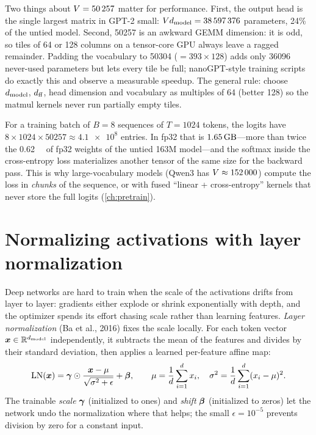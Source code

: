 \begin{systemslens}
Two things about $V=\num{50257}$ matter for performance. First, the output head is the single
largest matrix in GPT-2 small: $Vd_{\text{model}}=\num{38597376}$ parameters, 24\% of the untied model.
Second, \num{50257} is an awkward GEMM dimension: it is odd, so tiles of 64 or 128 columns on a
tensor-core GPU always leave a ragged remainder. Padding the vocabulary to \num{50304}
($=393\times128$) adds only \num{36096} never-used parameters but lets every tile be full;
nanoGPT-style training scripts do exactly this and observe a measurable speedup. The general rule:
choose $d_{\text{model}}$, $d_{\text{ff}}$, head dimension and vocabulary as multiples of 64 (better 128) so the
matmul kernels never run partially empty tiles.
\end{systemslens}

\begin{napkinmath}
For a training batch of $B=8$ sequences of $T=1024$ tokens, the logits have
$8\times1024\times\num{50257}\approx\num{4.1e8}$ entries. In fp32 that is
$\SI{1.65}{\giga\byte}$---more than twice the \SI{0.62}{\giga\byte} of fp32 weights of the
untied 163M model---and the softmax inside the cross-entropy loss materializes another tensor of
the same size for the backward pass. This is why large-vocabulary models (Qwen3 has
$V\approx\num{152000}$) compute the loss in \emph{chunks} of the sequence, or with fused
``linear + cross-entropy'' kernels that never store the full logits (\cref{ch:pretrain}).
\end{napkinmath}

\section{Normalizing activations with layer normalization}\label{sec:gpt:ln}

Deep networks are hard to train when the scale of the activations drifts from layer to layer:
gradients either explode or shrink exponentially with depth, and the optimizer spends its
effort chasing scale rather than learning features. \emph{Layer normalization} (Ba et al., 2016)
fixes the scale locally. For each token vector $\bm{x}\in\mathbb{R}^{d_{\text{model}}}$ independently, it
subtracts the mean of the features and divides by their standard deviation, then applies a
learned per-feature affine map:
\begin{equation}
\operatorname{LN}(\bm{x}) = \bm{\gamma}\odot\frac{\bm{x}-\mu}{\sqrt{\sigma^2+\epsilon}}+\bm{\beta},
\qquad \mu=\frac{1}{d}\sum_{i=1}^{d}x_i,\quad \sigma^2=\frac{1}{d}\sum_{i=1}^{d}(x_i-\mu)^2 .
\label{eq:gpt:ln}
\end{equation}
The trainable \emph{scale} $\bm{\gamma}$ (initialized to ones) and \emph{shift} $\bm{\beta}$
(initialized to zeros) let the network undo the normalization where that helps; the small
$\epsilon=10^{-5}$ prevents division by zero for a constant input.

